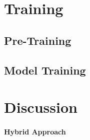 \documentclass{article}
\begin{document}
	\section{Training}

	\subsection{Pre-Training}

	\subsection{Model Training}

	\section{Discussion}

	\paragraph{Hybrid Approach}
\end{document}
